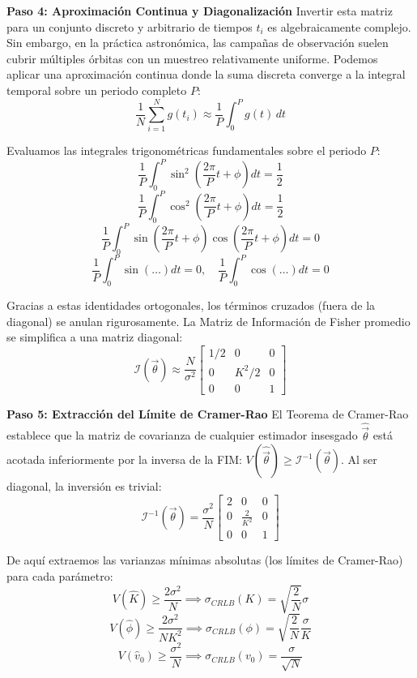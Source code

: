 \textbf{Paso 4: Aproximación Continua y Diagonalización}
Invertir esta matriz para un conjunto discreto y arbitrario de tiempos $t_i$ es algebraicamente complejo. Sin embargo, en la práctica astronómica, las campañas de observación suelen cubrir múltiples órbitas con un muestreo relativamente uniforme. Podemos aplicar una aproximación continua donde la suma discreta converge a la integral temporal sobre un periodo completo $P$:
$$ \frac{1}{N} \sum_{i=1}^N g(t_i) \approx \frac{1}{P} \int_0^P g(t) \, dt $$

Evaluamos las integrales trigonométricas fundamentales sobre el periodo $P$:
$$ \frac{1}{P} \int_0^P \sin^2\left(\frac{2\pi}{P}t + \phi\right) dt = \frac{1}{2} $$
$$ \frac{1}{P} \int_0^P \cos^2\left(\frac{2\pi}{P}t + \phi\right) dt = \frac{1}{2} $$
$$ \frac{1}{P} \int_0^P \sin\left(\frac{2\pi}{P}t + \phi\right)\cos\left(\frac{2\pi}{P}t + \phi\right) dt = 0 $$
$$ \frac{1}{P} \int_0^P \sin\left(\dots\right) dt = 0, \quad \frac{1}{P} \int_0^P \cos\left(\dots\right) dt = 0 $$

Gracias a estas identidades ortogonales, los términos cruzados (fuera de la diagonal) se anulan rigurosamente. La Matriz de Información de Fisher promedio se simplifica a una matriz diagonal:
$$ \mathcal{I}(\vec{\theta}) \approx \frac{N}{\sigma^2} \begin{bmatrix} 
1/2 & 0 & 0 \\ 
0 & K^2/2 & 0 \\ 
0 & 0 & 1 
\end{bmatrix} $$

\textbf{Paso 5: Extracción del Límite de Cramer-Rao}
El Teorema de Cramer-Rao establece que la matriz de covarianza de cualquier estimador insesgado $\hat{\vec{\theta}}$ está acotada inferiormente por la inversa de la FIM: $V(\hat{\vec{\theta}}) \ge \mathcal{I}^{-1}(\vec{\theta})$. Al ser diagonal, la inversión es trivial:
$$ \mathcal{I}^{-1}(\vec{\theta}) = \frac{\sigma^2}{N} \begin{bmatrix} 
2 & 0 & 0 \\ 
0 & \frac{2}{K^2} & 0 \\ 
0 & 0 & 1 
\end{bmatrix} $$

De aquí extraemos las varianzas mínimas absolutas (los límites de Cramer-Rao) para cada parámetro:
$$ V(\hat{K}) \ge \frac{2\sigma^2}{N} \implies \sigma_{CRLB}(K) = \sqrt{\frac{2}{N}} \sigma $$
$$ V(\hat{\phi}) \ge \frac{2\sigma^2}{N K^2} \implies \sigma_{CRLB}(\phi) = \sqrt{\frac{2}{N}} \frac{\sigma}{K} $$
$$ V(\hat{v}_0) \ge \frac{\sigma^2}{N} \implies \sigma_{CRLB}(v_0) = \frac{\sigma}{\sqrt{N}} $$

